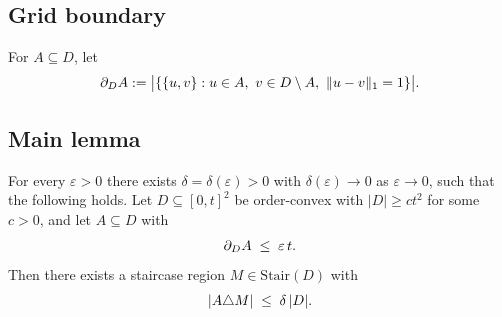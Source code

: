 \subsection{Grid boundary}

\begin{definition}\label{def:grid-bdy}
For $A \subseteq D$, let
\[
\bd_D A := \bigl|\{\{u,v\} : u\in A,\ v\in D\setminus A,\ \|u-v\|_1=1\}\bigr|.
\]
\end{definition}

\subsection{Main lemma}

\begin{lemma}\label{lem:weak-grid}
For every $\varepsilon>0$ there exists $\delta = \delta(\varepsilon) > 0$ with
$\delta(\varepsilon)\to 0$ as $\varepsilon\to 0$, such that the following holds. Let
$D \subseteq [0,t]^2$ be order-convex with $|D|\ge c t^2$ for some $c>0$, and let
$A \subseteq D$ with
\[
\partial_D A \;\le\; \varepsilon\, t.
\]
Then there exists a staircase region $M \in \mathrm{Stair}(D)$ with
\[
|A \triangle M| \;\le\; \delta\,|D|.
\]
\end{lemma}

